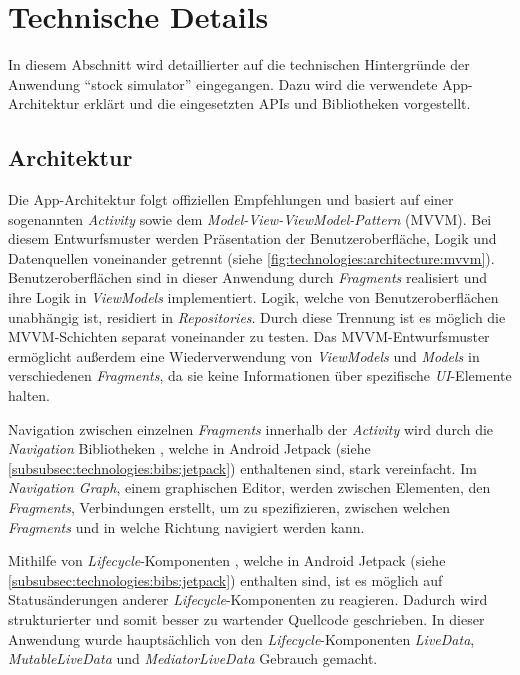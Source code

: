 \documentclass[a4paper]{article}
\begin{document}
\section{Technische Details}
\label{sec:technologies}
In diesem Abschnitt wird detaillierter auf die technischen Hintergründe der Anwendung "`stock simulator"' eingegangen.
Dazu wird die verwendete App-Architektur erklärt und die eingesetzten APIs und Bibliotheken vorgestellt.


\subsection{Architektur}
\label{subsec:technologies:architecture}
Die App-Architektur folgt offiziellen Empfehlungen \autocite{google_recommendations} und basiert auf einer sogenannten \textit{Activity} sowie dem \textit{Model-View-ViewModel-Pattern} (MVVM).
Bei diesem Entwurfsmuster werden Präsentation der Benutzeroberfläche, Logik und Datenquellen voneinander getrennt (siehe \autoref{fig:technologies:architecture:mvvm}).
Benutzeroberflächen sind in dieser Anwendung durch \textit{Fragments} realisiert und ihre Logik in \textit{ViewModels} implementiert.
Logik, welche von Benutzeroberflächen unabhängig ist, residiert in \textit{Repositories}.
Durch diese Trennung ist es möglich die MVVM-Schichten separat voneinander zu testen.
Das MVVM-Entwurfsmuster ermöglicht außerdem eine Wiederverwendung von \textit{ViewModels} und \textit{Models} in verschiedenen \textit{Fragments}, da sie keine Informationen über spezifische \textit{UI}-Elemente halten.

Navigation zwischen einzelnen \textit{Fragments} innerhalb der \textit{Activity} wird durch die \textit{Navigation} Bibliotheken \autocite{android_navigation}, welche in Android Jetpack (siehe \autoref{subsubsec:technologies:bibs:jetpack}) enthaltenen sind, stark vereinfacht.
Im \textit{Navigation Graph}, einem graphischen Editor, werden zwischen Elementen, den \textit{Fragments}, Verbindungen erstellt, um zu spezifizieren, zwischen welchen \textit{Fragments} und in welche Richtung navigiert werden kann.

Mithilfe von \textit{Lifecycle}-Komponenten \autocite{android_lifecycle}, welche in Android Jetpack (siehe \autoref{subsubsec:technologies:bibs:jetpack}) enthalten sind, ist es möglich auf Statusänderungen anderer \textit{Lifecycle}-Komponenten zu reagieren.
Dadurch wird strukturierter und somit besser zu wartender Quellcode geschrieben.
In dieser Anwendung wurde hauptsächlich von den \textit{Lifecycle}-Komponenten \textit{LiveData}, \textit{MutableLiveData} und \textit{MediatorLiveData} Gebrauch gemacht.
\end{document}
